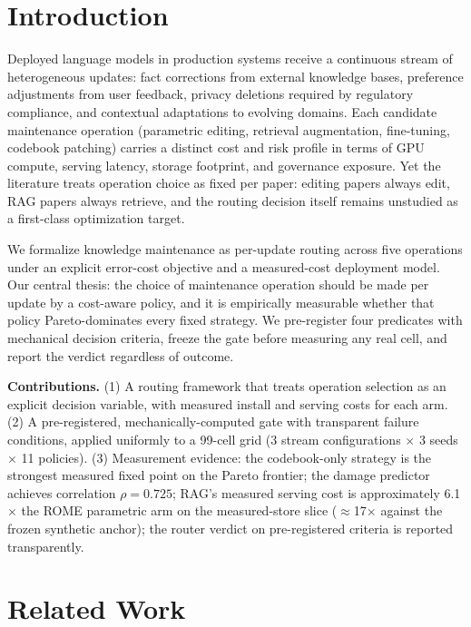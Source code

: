 \documentclass[preprint,12pt]{elsarticle}
\begin{document}
\section{Introduction}
\label{sec:intro}

Deployed language models in production systems receive a continuous stream of
heterogeneous updates: fact corrections from external knowledge bases, preference
adjustments from user feedback, privacy deletions required by regulatory compliance,
and contextual adaptations to evolving domains. Each candidate maintenance operation
(parametric editing, retrieval augmentation, fine-tuning, codebook patching) carries
a distinct cost and risk profile in terms of GPU compute, serving latency, storage
footprint, and governance exposure. Yet the literature treats operation choice as
fixed per paper: editing papers always edit, RAG papers always retrieve, and the
routing decision itself remains unstudied as a first-class optimization target.

We formalize knowledge maintenance as per-update routing across five operations under
an explicit error-cost objective and a measured-cost deployment model. Our central
thesis: the choice of maintenance operation should be made per update by a cost-aware
policy, and it is empirically measurable whether that policy Pareto-dominates every
fixed strategy. We pre-register four predicates with mechanical decision criteria,
freeze the gate before measuring any real cell, and report the verdict regardless of
outcome.

\textbf{Contributions.} (1) A routing framework that treats operation selection as
an explicit decision variable, with measured install and serving costs for each arm.
(2) A pre-registered, mechanically-computed gate with transparent failure conditions,
applied uniformly to a 99-cell grid (3 stream configurations $\times$ 3 seeds
$\times$ 11 policies). (3) Measurement evidence: the codebook-only strategy is the
strongest measured fixed point on the Pareto frontier; the damage predictor achieves correlation $\rho = 0.725$; RAG's
measured serving cost is approximately 6.1$\times$ the ROME parametric arm on the
measured-store slice ($\approx$17$\times$ against the frozen synthetic anchor); the router verdict
on pre-registered criteria is reported transparently.

\section{Related Work}
\label{sec:related}
\end{document}
